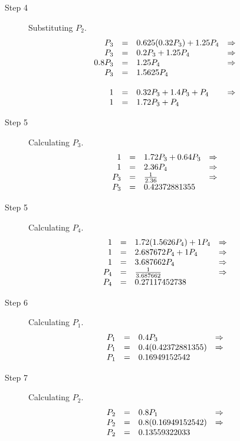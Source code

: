 \documentclass[12pt]{report}
\begin{document}
\begin{description}
	\item[Step 4] Substituting $P_2$.
	$$\begin{array}{r c l c}
		P_3 & = & 0.625(0.32P_3) + 1.25P_4 & \Rightarrow\\
		P_3 & = & 0.2P_3 + 1.25P_4 & \Rightarrow\\
		0.8P_3 & = & 1.25P_4 & \Rightarrow\\
		P_3 & = & 1.5625P_4\\
		\\
		1 & = & 0.32P_3 + 1.4P_3 + P_4 & \Rightarrow\\
		1 & = & 1.72P_3 + P_4
	\end{array}$$
	
	\item[Step 5] Calculating $P_3$.
	$$\begin{array}{r c l c}
		1 & = & 1.72P_3 + 0.64P_3 & \Rightarrow\\
		1 & = & 2.36P_4 & \Rightarrow\\
		P_3 & = & \frac{1}{2.36} & \Rightarrow\\
		P_3 & = & 0.42372881355 
	\end{array}$$
	
	\item[Step 5] Calculating $P_4$.
	$$\begin{array}{r c l c}
		1 & = & 1.72(1.5626P_4) + 1P_4 & \Rightarrow\\
		1 & = & 2.687672P_4 + 1P_4 & \Rightarrow\\
		1 & = & 3.687662P_4 & \Rightarrow\\
		P_4 & = & \frac{1}{3.687662} & \Rightarrow\\
		P_4 & = & 0.27117452738 
	\end{array}$$
	
	\item[Step 6] Calculating $P_1$.
	$$\begin{array}{r c l c}
		P_1 & = & 0.4P_3 & \Rightarrow\\
		P_1 & = & 0.4(0.42372881355) & \Rightarrow\\
		P_1 & = & 0.16949152542
	\end{array}$$
	
	\item[Step 7] Calculating $P_2$.
	$$\begin{array}{r c l c}
		P_2 & = & 0.8P_1 & \Rightarrow\\
		P_2 & = & 0.8(0.16949152542) & \Rightarrow\\
		P_2 & = & 0.13559322033
	\end{array}$$
\end{description}
\end{document}
